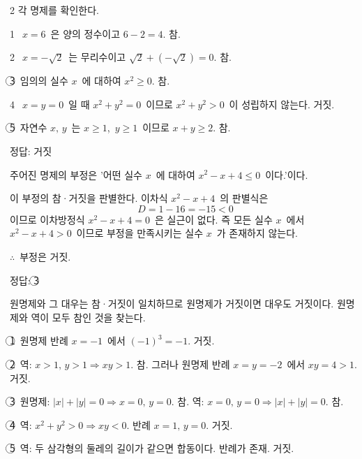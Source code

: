 \documentclass[10pt,fleqn]{article}
\begin{document}
\begin{multicols*}{2}
각 명제를 확인한다.

\vspace{3mm}
\textcircled{\scriptsize 1}\ $x=6$\ 은 양의 정수이고 $6-2=4$. 참.

\textcircled{\scriptsize 2}\ $x=-\sqrt{2}$\ 는 무리수이고 $\sqrt{2}+(-\sqrt{2})=0$. 참.

\textcircled{\scriptsize 3}\ 임의의 실수 $x$\ 에 대하여 $x^{2}\ge 0$. 참.

\textcircled{\scriptsize 4}\ $x=y=0$\ 일 때 $x^{2}+y^{2}=0$\ 이므로 $x^{2}+y^{2}>0$\ 이 성립하지 않는다. 거짓.

\textcircled{\scriptsize 5}\ 자연수 $x,\,y$\ 는 $x\ge 1$,\ $y\ge 1$\ 이므로 $x+y\ge 2$. 참.

\begin{dmanswerbox}
정답: 거짓
\end{dmanswerbox}

주어진 명제의 부정은 '어떤 실수 $x$\ 에 대하여 $x^{2}-x+4\le 0$\ 이다.'이다.

이 부정의 참·거짓을 판별한다. 이차식 $x^{2}-x+4$\ 의 판별식은
\[ D=1-16=-15<0 \]
이므로 이차방정식 $x^{2}-x+4=0$\ 은 실근이 없다. 즉 모든 실수 $x$\ 에서 $x^{2}-x+4>0$\ 이므로 부정을 만족시키는 실수 $x$\ 가 존재하지 않는다.

$\therefore$\ 부정은 거짓.

\begin{dmanswerbox}
정답: \textcircled{\scriptsize 3}
\end{dmanswerbox}

원명제와 그 대우는 참·거짓이 일치하므로 원명제가 거짓이면 대우도 거짓이다. 원명제와 역이 모두 참인 것을 찾는다.

\vspace{3mm}
\textcircled{\scriptsize 1}\ 원명제 반례 $x=-1$\ 에서 $(-1)^{3}=-1$. 거짓.

\textcircled{\scriptsize 2}\ 역: $x>1,\,y>1\Rightarrow xy>1$. 참. 그러나 원명제 반례 $x=y=-2$\ 에서 $xy=4>1$. 거짓.

\textcircled{\scriptsize 3}\ 원명제: $|x|+|y|=0\Rightarrow x=0,\,y=0$. 참. 역: $x=0,\,y=0\Rightarrow |x|+|y|=0$. 참.

\textcircled{\scriptsize 4}\ 역: $x^{2}+y^{2}>0\Rightarrow xy<0$. 반례 $x=1,\,y=0$. 거짓.

\textcircled{\scriptsize 5}\ 역: 두 삼각형의 둘레의 길이가 같으면 합동이다. 반례가 존재. 거짓.


\end{multicols*}
\end{document}

